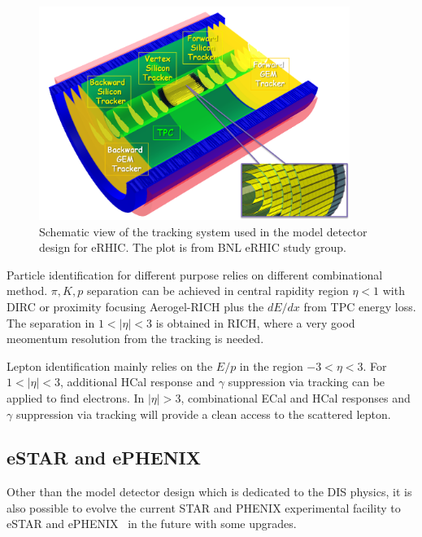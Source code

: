 \begin{figure}
\centering
\includegraphics[width=0.9\textwidth]{plots/chpt4/eRHIC_model_tracking.png}
\caption[Tracking system of the eRHIC model detector design]{
Schematic view of the tracking system used in the model detector design for eRHIC. The plot is from BNL eRHIC study group.}
\label{fig:tracking_eRHIC}
\end{figure}


Particle identification for different purpose relies on different combinational
method. $\pi, K, p$ separation can be achieved in central rapidity region
$\eta<1$ with DIRC or proximity focusing Aerogel-RICH plus the $dE/dx$ from TPC
energy loss. The separation in $1<|\eta|<3$ is obtained in RICH, where a very
good meomentum resolution from the tracking is needed.

Lepton identification mainly relies on the $E/p$ in the region $-3<\eta<3$. For
$1<|\eta|<3$, additional HCal response and $\gamma$ suppression via tracking can
be applied to find electrons. In $|\eta|>3$, combinational ECal and HCal
responses and $\gamma$ suppression via tracking will provide a clean access to
the scattered lepton.


\subsection{eSTAR and ePHENIX}
Other than the model detector design which is dedicated to the DIS physics, it
is also possible to evolve the current STAR and PHENIX experimental facility to
eSTAR and ePHENIX~\cite{Adare:2014aaa} in the future with some upgrades. 


